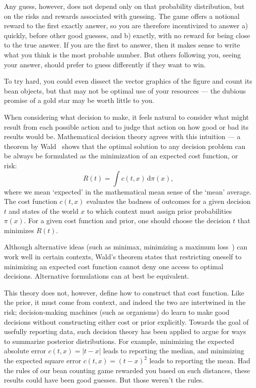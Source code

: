 Any guess, however, does not depend only on that probability distribution,
but on the risks and rewards associated with guessing.
The game offers a notional reward to the first exactly answer, so
you are therefore incentivized to answer a) quickly, before other good guesses,
and b) exactly, with no reward for being close to the true answer.
If you are the first to answer, then it makes sense to write what you think
is the most probable number.
But others following you, seeing your answer, should prefer to guess
differently if they want to win.

To try hard, you could even dissect the vector graphics of the figure and count
its bean objects, but that may not be optimal use of your resources --- the
dubious promise of a gold star may be worth little to you.

When considering what decision to make, it feels natural to consider what
might result from each possible action and to judge that action on how good or
bad its results would be.
Mathematical decision theory agrees with this intuition ---
a theorem by Wald~\cite{
wald1947bayes,
wald1950bayes,
jaynes2003probability
}
shows that the optimal solution to any decision problem can be always be
formulated as the minimization of an expected cost function, or risk:
\begin{equation}
\label{eqn:searches_bayes_decision_rule}
R(t) = \int\! c(t, x) \,\mathrm{d}\pi(x)
,
\end{equation}
where we mean `expected' in the mathematical mean sense of the `mean' average.
The cost function $c(t, x)$ evaluates the badness of outcomes for a given
decision $t$ and states of the world $x$ to which context must assign prior
probabilities $\pi(x)$.
For a given cost function and prior, one should choose the decision $t$ that
minimizes $R(t)$.

Although alternative ideas (such as minimax, minimizing a maximum
loss~\cite{savage1951review}) can work well in certain contexts,
Wald's theorem states that restricting oneself to minimizing an expected cost
function cannot deny one access to optimal decisions.
Alternative formulations can at best be equivalent.

This theory does not, however, define how to construct that cost function.
Like the prior, it must come from context, and indeed the two are intertwined
in the risk;
decision-making machines (such as organisms) do learn to make good
decisions without constructing either cost or prior explicitly.
Towards the goal of usefully reporting data, such decision theory has been
applied to argue for ways to summarize posterior distributions.
For example, minimizing the expected absolute error
$c(t, x) = |t - x|$ leads
to reporting the median, and minimizing the expected square error
$c(t, x) = (t - x)^2$ leads to reporting the mean.
Had the rules of our bean counting game rewarded you based on such distances,
these results could have been good guesses.
But those weren't the rules.

